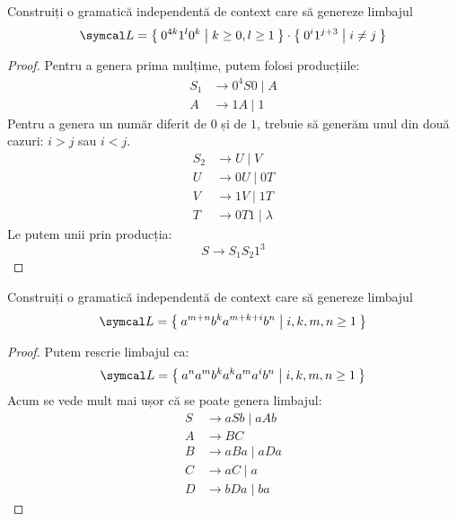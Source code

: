 \begin{exercise}
    Construiți o gramatică independentă de context care să genereze limbajul
    \[\lang = \Set{ 0^{4k} 1^l 0^k | k \geq 0, l \geq 1 } \cdot \Set{ 0^i 1^{j + 3} | i \neq j}\]
\end{exercise}
\begin{proof}
    Pentru a genera prima mulțime, putem folosi producțiile:
    \begin{align*}
        S_1 & \rightarrow 0^4 S 0 \mid A \\
        A   & \rightarrow 1 A \mid 1
    \end{align*}
    Pentru a genera un număr diferit de \(0\) și de \(1\), trebuie să generăm unul din două cazuri: \(i > j\) sau \(i < j\).
    \begin{align*}
        S_2 & \rightarrow U \mid V                     \\
        U   & \rightarrow 0 U \mid 0 T \tag{\(i > j\)} \\
        V   & \rightarrow 1 V \mid 1 T \tag{\(i < j\)} \\
        T   & \rightarrow 0 T 1 \mid \lambda
    \end{align*}
    Le putem unii prin producția:
    \[S \rightarrow S_1 S_2 1^3\]
\end{proof}

\begin{exercise}
    Construiți o gramatică independentă de context care să genereze limbajul
    \[\lang = \Set{ a^{m + n} b^k a^{m + k + i} b^n | i, k, m, n \geq 1 }\]
\end{exercise}
\begin{proof}
    Putem rescrie limbajul ca:
    \[\lang = \Set{ a^n a^m b^k a^k a^m a^i b^n | i, k, m, n \geq 1 }\]
    Acum se vede mult mai ușor că se poate genera limbajul:
    \begin{align*}
        S & \rightarrow a S b \mid a A b \tag{generează \(a^n \dots b^n\)} \\
        A & \rightarrow B C                                                \\
        B & \rightarrow a B a \mid a D a \tag{generează \(a^m \dots a^m\)} \\
        C & \rightarrow aC \mid a \tag{generează \(a^i\)}                  \\
        D & \rightarrow bDa \mid ba \tag{generează \(b^k a^k\)}
    \end{align*}
\end{proof}


